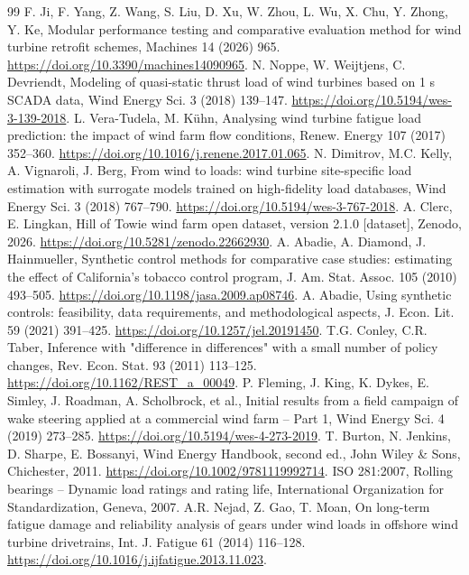\documentclass[preprint,12pt]{elsarticle}
\begin{document}
\begin{thebibliography}{99}
 F. Ji, F. Yang, Z. Wang, S. Liu, D. Xu, W. Zhou, L. Wu, X. Chu, Y. Zhong, Y. Ke, Modular performance testing and comparative evaluation method for wind turbine retrofit schemes, Machines 14 (2026) 965. \url{https://doi.org/10.3390/machines14090965}.
 N. Noppe, W. Weijtjens, C. Devriendt, Modeling of quasi-static thrust load of wind turbines based on 1 s SCADA data, Wind Energy Sci. 3 (2018) 139--147. \url{https://doi.org/10.5194/wes-3-139-2018}.
 L. Vera-Tudela, M. Kühn, Analysing wind turbine fatigue load prediction: the impact of wind farm flow conditions, Renew. Energy 107 (2017) 352--360. \url{https://doi.org/10.1016/j.renene.2017.01.065}.
 N. Dimitrov, M.C. Kelly, A. Vignaroli, J. Berg, From wind to loads: wind turbine site-specific load estimation with surrogate models trained on high-fidelity load databases, Wind Energy Sci. 3 (2018) 767--790. \url{https://doi.org/10.5194/wes-3-767-2018}.
 A. Clerc, E. Lingkan, Hill of Towie wind farm open dataset, version 2.1.0 [dataset], Zenodo, 2026. \url{https://doi.org/10.5281/zenodo.22662930}.
 A. Abadie, A. Diamond, J. Hainmueller, Synthetic control methods for comparative case studies: estimating the effect of California's tobacco control program, J. Am. Stat. Assoc. 105 (2010) 493--505. \url{https://doi.org/10.1198/jasa.2009.ap08746}.
 A. Abadie, Using synthetic controls: feasibility, data requirements, and methodological aspects, J. Econ. Lit. 59 (2021) 391--425. \url{https://doi.org/10.1257/jel.20191450}.
 T.G. Conley, C.R. Taber, Inference with "difference in differences" with a small number of policy changes, Rev. Econ. Stat. 93 (2011) 113--125. \url{https://doi.org/10.1162/REST_a_00049}.
 P. Fleming, J. King, K. Dykes, E. Simley, J. Roadman, A. Scholbrock, et al., Initial results from a field campaign of wake steering applied at a commercial wind farm -- Part 1, Wind Energy Sci. 4 (2019) 273--285. \url{https://doi.org/10.5194/wes-4-273-2019}.
 T. Burton, N. Jenkins, D. Sharpe, E. Bossanyi, Wind Energy Handbook, second ed., John Wiley \& Sons, Chichester, 2011. \url{https://doi.org/10.1002/9781119992714}.
 ISO 281:2007, Rolling bearings -- Dynamic load ratings and rating life, International Organization for Standardization, Geneva, 2007.
 A.R. Nejad, Z. Gao, T. Moan, On long-term fatigue damage and reliability analysis of gears under wind loads in offshore wind turbine drivetrains, Int. J. Fatigue 61 (2014) 116--128. \url{https://doi.org/10.1016/j.ijfatigue.2013.11.023}.

\end{thebibliography}
\end{document}

